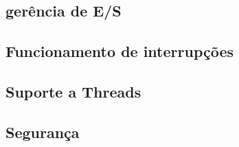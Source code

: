 \documentclass[conference]{IEEEtran}
\begin{document}
\subsection{gerência de E/S}\label{sec:HurdES}

\subsection{Funcionamento de interrupções}\label{sec:HurdInt}

\subsection{Suporte a Threads}\label{sec:HurdThreads}

\subsection{Segurança}\label{sec:HurdSec}




\end{document}
